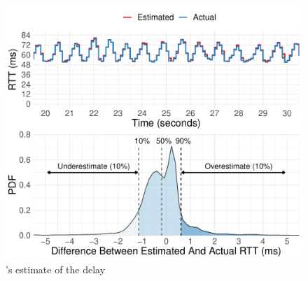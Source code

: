 \begin{figure}
    \centering
\begin{knitrout}
\color{fgcolor}
\includegraphics[width=\maxwidth]{figure/micro_time-delay-1} 

\end{knitrout}

    \caption{\name's estimate of the delay }
    \label{fig:micro:time-delay}
\end{figure}
